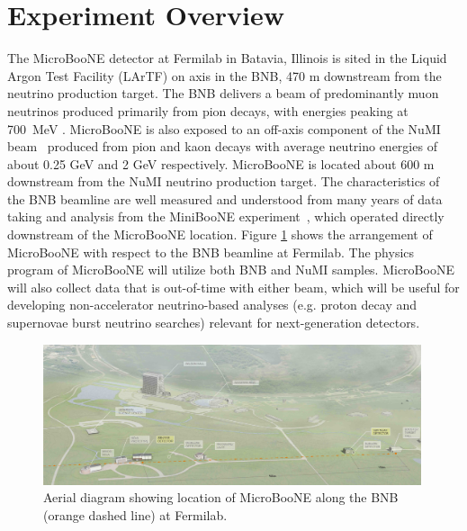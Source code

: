 \section{Experiment Overview}
\label{sec:overview}

The MicroBooNE detector at Fermilab in Batavia, Illinois is sited in the Liquid Argon Test Facility (LArTF) on axis in the BNB, 470 m downstream from the neutrino production target.   The BNB delivers a beam of predominantly muon neutrinos produced primarily from pion decays, with energies peaking at 700~MeV \cite{AguilarArevalo:2008yp}. MicroBooNE is also exposed to an off-axis component of the NuMI beam~\cite{Adamson:2015dkw} produced from pion and kaon decays with average neutrino energies of about 0.25 GeV and 2 GeV respectively.   MicroBooNE is located about 600 m downstream from the NuMI neutrino production target.  The characteristics of the BNB beamline are well measured and understood from many years of data taking and analysis from the MiniBooNE experiment~\cite{AguilarArevalo:2008yp}, which operated directly downstream of the MicroBooNE location.  Figure \ref{fnalmap} shows the arrangement of MicroBooNE with respect to the BNB beamline at Fermilab.  The physics program of MicroBooNE will utilize both BNB and NuMI samples.  MicroBooNE will also collect data that is out-of-time with either beam, which will be useful for developing non-accelerator neutrino-based analyses (e.g. proton decay and supernovae burst neutrino searches) relevant for next-generation detectors.  


\begin{figure}
\centering 
\includegraphics[width=0.99\textwidth]{figures/aerial_diagram.jpg}
\caption{Aerial diagram showing location of MicroBooNE along the BNB (orange dashed line) at Fermilab.}
\label{fnalmap}
\end{figure}


